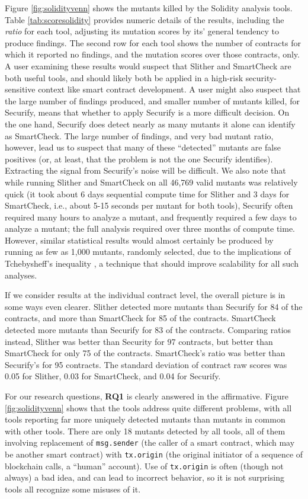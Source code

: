 Figure \ref{fig:solidityvenn} shows the mutants killed by the Solidity analysis tools.  Table \ref{tab:scoresolidity} provides numeric details of the results, including the \emph{ratio} for each tool, adjusting its mutation scores by its' general tendency to produce findings.  The second row for each tool shows the number of contracts for which it reported no findings, and the mutation scores over those contracts, only. A user examining these results would suspect that Slither and SmartCheck are both useful tools, and should likely both be applied in a high-risk security-sensitive context like smart contract development.  A user might also suspect that the large number of findings produced, and smaller number of mutants killed, for Securify, means that whether to apply Securify is a more difficult decision.  On the one hand, Securify does detect nearly as many mutants it alone can identify as SmartCheck.  The large number of findings, and very bad mutant ratio, however, lead us to suspect that many of these ``detected'' mutants are false positives (or, at least, that the problem is not the one Securify identifies).  Extracting the signal from Securify's noise will be difficult.  We also note that while running Slither and SmartCheck on all 46,769 valid mutants was relatively quick (it took about 6 days sequential compute time for Slither and 3 days for SmartCheck, i.e., about 5-15 seconds per mutant for both tools), Securify often required many hours to analyze a mutant, and frequently required a few days to analyze a mutant; the full analysis required over three months of compute time.  However, similar statistical results would almost certainly be produced by running as few as 1,000 mutants, randomly selected, due to the implications of Tchebysheff’s inequality \cite{gopinath2015hard}, a technique that should improve scalability for all such analyses.

If we consider results at the individual contract level, the overall picture is in some ways even clearer.  Slither detected more mutants than Securify for 84 of the contracts, and more than SmartCheck for 85 of the contracts.  SmartCheck detected more mutants than Securify for 83 of the contracts.  Comparing ratios instead, Slither was better than Security for 97 contracts, but better than SmartCheck for only 75 of the contracts.  SmartCheck's ratio was better than Securify's for 95 contracts.  The standard deviation of contract raw scores was 0.05 for Slither, 0.03 for SmartCheck, and 0.04 for Securify.

For our research questions, {\bf RQ1} is clearly answered in the affirmative.  Figure \ref{fig:solidityvenn} shows that the tools address quite different problems, with all tools reporting far more uniquely detected mutants than mutants in common with other tools.  There are only 18 mutants detected by all tools, all of them involving replacement of {\tt msg.sender} (the caller of a smart contract, which may be another smart contract) with {\tt tx.origin} (the original initiator of a sequence of blockchain calls, a ``human'' account).  Use of {\tt tx.origin} is often (though not always) a bad idea, and can lead to incorrect behavior, so it is not surprising tools all recognize some misuses of it.

